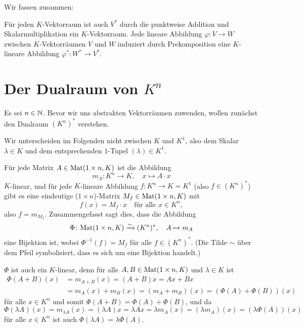 \documentclass[a4paper,10pt]{article}
\begin{document}
Wir fassen zusammen:

\begin{shaded}
 Für jeden $K$-Vektorraum ist auch $V^*$ durch die punktweise Addition und Skalarmultiplikation ein $K$-Vektorraum. Jede lineare Abbildung $\varphi \colon V \to W$ zwischen $K$-Vektorräumen $V$ und $W$ induziert durch Prekomposition eine $K$-lineare Abbildung $\varphi^* \colon W^* \to V^*$.
\end{shaded}










\section{Der Dualraum von $K^n$}
Es sei $n \in \mathbb{N}$. Bevor wir uns abstrakten Vektorräumen zuwenden, wollen zunächst den Dualraum $(K^n)^*$ verstehen.

\begin{bem}
 Wir unterscheiden im Folgenden nicht zwischen $K$ und $K^1$, also dem Skalar $\lambda \in K$ und dem entsprechenden $1$-Tupel $(\lambda) \in K^1$.
\end{bem}

Für jede Matrix $A \in \mathrm{Mat}(1 \times n, K)$ ist die Abbildung
\[
 m_A \colon K^n \to K, \quad x \mapsto A \cdot x
\]
$K$-linear, und für jede $K$-lineare Abbildung $f \colon K^n \to K = K^1$ (also $f \in (K^n)^*$) gibt es eine eindeutige ($1 \times n$)-Matrix $M_f \in \mathrm{Mat}(1 \times n, K)$ mit
\[
 f(x) = M_f \cdot x
 \quad \text{für alle $x \in K^n$},
\]
also $f = m_{M_f}$. Zusammengefasst sagt dies, dass die Abbildung
\[
 \Phi \colon \mathrm{Mat}(1 \times n, K) \xrightarrow{\sim} (K^n)^*, \quad A \mapsto m_A
\]
eine Bijektion ist, wobei $\Phi^{-1}(f) = M_f$ für alle $f \in (K^n)^*$. (Die Tilde $\sim$ über dem Pfeil symbolisiert, dass es sich um eine Bijektion handelt.)

$\Phi$ ist auch ein $K$-linear, denn für alle $A, B \in \mathrm{Mat}(1 \times n, K)$ und $\lambda \in K$ ist
\begin{align*}
 \Phi(A+B)(x)
 &= m_{A+B}(x)
 = (A+B)x
 = Ax + Bx \\
 &= m_A(x) + m_B(x)
 = (m_A+m_B)(x)
 = (\Phi(A)+\Phi(B))(x)
\end{align*}
für alle $x \in K^n$ und somit $\Phi(A+B) = \Phi(A) + \Phi(B)$, und da
\[
 \Phi(\lambda A)(x)
 = m_{\lambda A}(x)
 = (\lambda A)x
 = \lambda Ax
 = \lambda m_A(x)
 = (\lambda m_A)(x)
 = (\lambda \Phi(A))(x)
\]
für alle $x \in K^n$ ist auch $\Phi(\lambda A) = \lambda \Phi(A)$.
\end{document}
